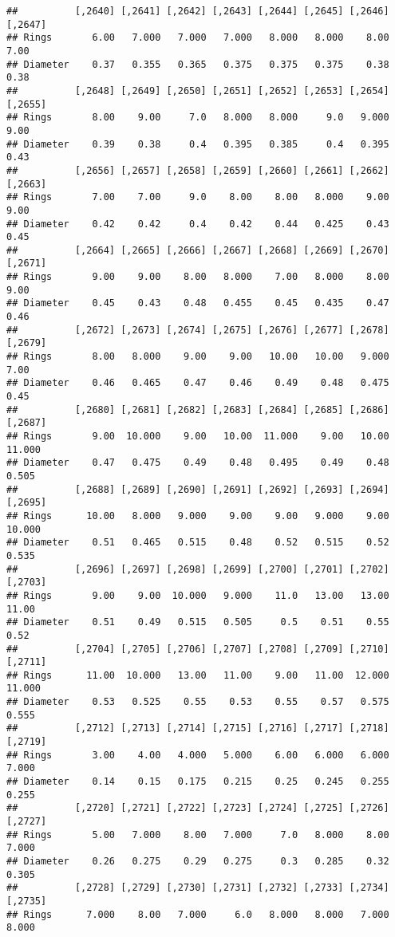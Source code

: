 \documentclass[
]{article}
\begin{document}
\begin{verbatim}
##          [,2640] [,2641] [,2642] [,2643] [,2644] [,2645] [,2646] [,2647]
## Rings       6.00   7.000   7.000   7.000   8.000   8.000    8.00    7.00
## Diameter    0.37   0.355   0.365   0.375   0.375   0.375    0.38    0.38
##          [,2648] [,2649] [,2650] [,2651] [,2652] [,2653] [,2654] [,2655]
## Rings       8.00    9.00     7.0   8.000   8.000     9.0   9.000    9.00
## Diameter    0.39    0.38     0.4   0.395   0.385     0.4   0.395    0.43
##          [,2656] [,2657] [,2658] [,2659] [,2660] [,2661] [,2662] [,2663]
## Rings       7.00    7.00     9.0    8.00    8.00   8.000    9.00    9.00
## Diameter    0.42    0.42     0.4    0.42    0.44   0.425    0.43    0.45
##          [,2664] [,2665] [,2666] [,2667] [,2668] [,2669] [,2670] [,2671]
## Rings       9.00    9.00    8.00   8.000    7.00   8.000    8.00    9.00
## Diameter    0.45    0.43    0.48   0.455    0.45   0.435    0.47    0.46
##          [,2672] [,2673] [,2674] [,2675] [,2676] [,2677] [,2678] [,2679]
## Rings       8.00   8.000    9.00    9.00   10.00   10.00   9.000    7.00
## Diameter    0.46   0.465    0.47    0.46    0.49    0.48   0.475    0.45
##          [,2680] [,2681] [,2682] [,2683] [,2684] [,2685] [,2686] [,2687]
## Rings       9.00  10.000    9.00   10.00  11.000    9.00   10.00  11.000
## Diameter    0.47   0.475    0.49    0.48   0.495    0.49    0.48   0.505
##          [,2688] [,2689] [,2690] [,2691] [,2692] [,2693] [,2694] [,2695]
## Rings      10.00   8.000   9.000    9.00    9.00   9.000    9.00  10.000
## Diameter    0.51   0.465   0.515    0.48    0.52   0.515    0.52   0.535
##          [,2696] [,2697] [,2698] [,2699] [,2700] [,2701] [,2702] [,2703]
## Rings       9.00    9.00  10.000   9.000    11.0   13.00   13.00   11.00
## Diameter    0.51    0.49   0.515   0.505     0.5    0.51    0.55    0.52
##          [,2704] [,2705] [,2706] [,2707] [,2708] [,2709] [,2710] [,2711]
## Rings      11.00  10.000   13.00   11.00    9.00   11.00  12.000  11.000
## Diameter    0.53   0.525    0.55    0.53    0.55    0.57   0.575   0.555
##          [,2712] [,2713] [,2714] [,2715] [,2716] [,2717] [,2718] [,2719]
## Rings       3.00    4.00   4.000   5.000    6.00   6.000   6.000   7.000
## Diameter    0.14    0.15   0.175   0.215    0.25   0.245   0.255   0.255
##          [,2720] [,2721] [,2722] [,2723] [,2724] [,2725] [,2726] [,2727]
## Rings       5.00   7.000    8.00   7.000     7.0   8.000    8.00   7.000
## Diameter    0.26   0.275    0.29   0.275     0.3   0.285    0.32   0.305
##          [,2728] [,2729] [,2730] [,2731] [,2732] [,2733] [,2734] [,2735]
## Rings      7.000    8.00   7.000     6.0   8.000   8.000   7.000   8.000

\end{verbatim}
\end{document}
